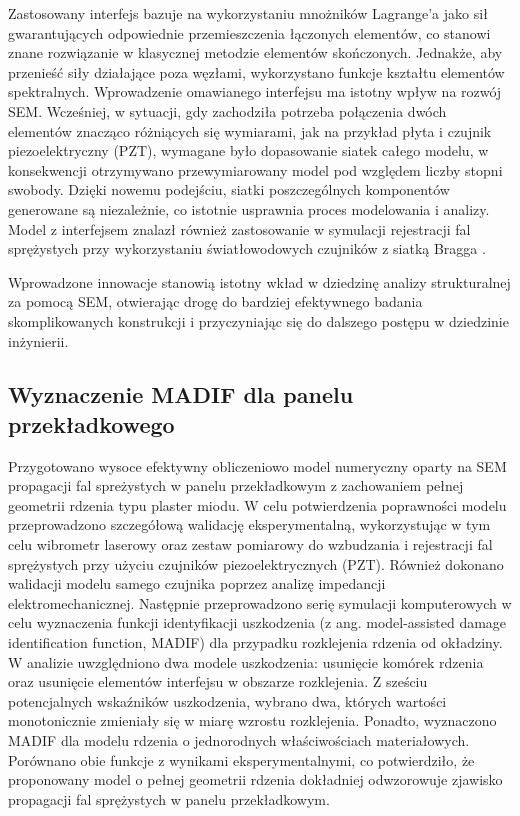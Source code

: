 \documentclass[a4paper,11pt]{article}
\begin{document}
Zastosowany interfejs bazuje na wykorzystaniu mnożników Lagrange’a jako sił gwarantujących odpowiednie przemieszczenia łączonych elementów, co stanowi znane rozwiązanie w klasycznej metodzie elementów skończonych. Jednakże, aby przenieść siły działające poza węzłami, wykorzystano funkcje kształtu elementów spektralnych.
Wprowadzenie omawianego interfejsu ma istotny wpływ na rozwój SEM. Wcześniej, w sytuacji, gdy zachodziła potrzeba połączenia dwóch elementów znacząco różniących się wymiarami, jak na przykład płyta i czujnik piezoelektryczny (PZT), wymagane było dopasowanie siatek całego modelu, w konsekwencji otrzymywano przewymiarowany model pod względem liczby stopni swobody. Dzięki nowemu podejściu, siatki poszczególnych komponentów generowane są niezależnie, co istotnie usprawnia proces modelowania i analizy. Model z interfejsem znalazł również zastosowanie w symulacji rejestracji fal sprężystych przy wykorzystaniu światłowodowych czujników z siatką Bragga \cite{fiborek2022spectral}.

Wprowadzone innowacje stanowią istotny wkład w dziedzinę analizy strukturalnej za pomocą SEM, otwierając drogę do bardziej efektywnego badania skomplikowanych konstrukcji i przyczyniając się do dalszego postępu w dziedzinie inżynierii.

\subsection{Wyznaczenie MADIF dla panelu przekładkowego}
Przygotowano wysoce efektywny obliczeniowo model numeryczny oparty na SEM \cite{balasubramaniam2021damage, fiborek2021model-assisted} propagacji fal spreżystych w panelu przekładkowym z zachowaniem pełnej geometrii rdzenia typu plaster miodu. W celu potwierdzenia poprawności modelu przeprowadzono szczegółową walidację eksperymentalną, wykorzystując w tym celu wibrometr laserowy oraz zestaw pomiarowy do wzbudzania i rejestracji fal sprężystych przy użyciu czujników piezoelektrycznych (PZT). Również dokonano walidacji modelu samego czujnika poprzez analizę impedancji elektromechanicznej.
Następnie przeprowadzono serię symulacji komputerowych w celu wyznaczenia funkcji identyfikacji uszkodzenia (z ang. model-assisted damage identification function, MADIF) dla przypadku rozklejenia rdzenia od okładziny. W analizie uwzględniono dwa modele uszkodzenia: usunięcie komórek rdzenia oraz usunięcie elementów interfejsu w obszarze rozklejenia. Z sześciu potencjalnych wskaźników uszkodzenia, wybrano dwa, których wartości monotonicznie zmieniały się w miarę wzrostu rozklejenia. Ponadto, wyznaczono MADIF dla modelu rdzenia o jednorodnych właściwościach materiałowych. Porównano obie funkcje z wynikami eksperymentalnymi, co potwierdziło, że proponowany model o pełnej geometrii rdzenia dokładniej odwzorowuje zjawisko propagacji fal sprężystych w panelu przekładkowym.
\end{document}
